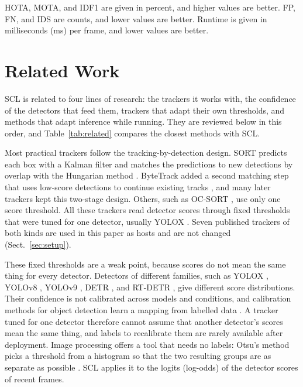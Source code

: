 \documentclass[pdflatex,referee,sn-mathphys-num]{sn-jnl}
\newcommand{\scl}{SCL}
\begin{document}
HOTA, MOTA, and IDF1 are given in percent, and higher values are better. FP,
FN, and IDS are counts, and lower values are better. Runtime is given in
milliseconds (ms) per frame, and lower values are better.
\section{Related Work}\label{sec:related}

\scl{} is related to four lines of research: the trackers it works with, the
confidence of the detectors that feed them, trackers that adapt their own
thresholds, and methods that adapt inference while running. They are
reviewed below in this order, and Table~\ref{tab:related} compares the
closest methods with \scl{}.

Most practical trackers follow the tracking-by-detection design. SORT
predicts each box with a Kalman filter and matches the predictions to new
detections by overlap with the Hungarian method \cite{bewley2016sort}.
ByteTrack added a second matching step that uses low-score detections to
continue existing tracks \cite{zhang2022bytetrack}, and many later trackers
kept this two-stage design. Others, such as OC-SORT \cite{cao2023ocsort}, use
only one score threshold. All these trackers read detector scores through
fixed thresholds that were tuned for one detector, usually YOLOX
\cite{ge2021yolox}. Seven published trackers of both kinds are used in this
paper as hosts and are not changed (Sect.~\ref{sec:setup}).

These fixed thresholds are a weak point, because scores do not mean the same
thing for every detector. Detectors of different families, such as YOLOX
\cite{ge2021yolox}, YOLOv8 \cite{jocher2023yolov8}, YOLOv9
\cite{wang2024yolov9}, DETR \cite{carion2020detr}, and RT-DETR
\cite{zhao2024rtdetr}, give different score distributions. Their confidence
is not calibrated across models and conditions, and calibration methods for
object detection learn a mapping from labelled data
\cite{kuppers2020detcalib}. A tracker tuned for one detector therefore cannot
assume that another detector's scores mean the same thing, and labels to
recalibrate them are rarely available after deployment. Image processing
offers a tool that needs no labels: Otsu's method picks a threshold from a
histogram so that the two resulting groups are as separate as possible
\cite{otsu1979}. \scl{} applies it to the logits (log-odds) of the detector
scores of recent frames.
\end{document}
